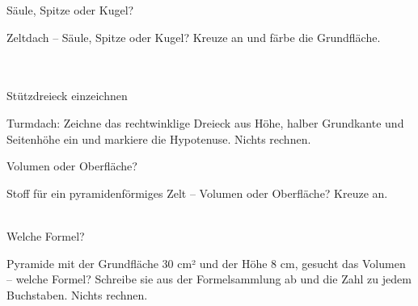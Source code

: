 \setcounter{aufgabe}{11}

\begin{aufgabe}{Säule, Spitze oder Kugel?}
\begin{teile}
\teil Zeltdach – Säule, Spitze oder Kugel? Kreuze an und färbe die Grundfläche.\\ \\ \\ 

\end{teile}
\end{aufgabe}

\begin{aufgabe}{Stützdreieck einzeichnen}
\begin{teile}
\teil Turmdach: Zeichne das rechtwinklige Dreieck aus Höhe, halber Grundkante und Seitenhöhe ein und markiere die Hypotenuse. Nichts rechnen.

\end{teile}
\end{aufgabe}

\begin{aufgabe}{Volumen oder Oberfläche?}
\begin{teile}
\teil Stoff für ein pyramidenförmiges Zelt – Volumen oder Oberfläche? Kreuze an.\\ \\ 
\end{teile}
\end{aufgabe}

\begin{aufgabe}{Welche Formel?}
\begin{teile}
\teil Pyramide mit der Grundfläche $30$ cm² und der Höhe $8$ cm, gesucht das Volumen – welche Formel? Schreibe sie aus der Formelsammlung ab und die Zahl zu jedem Buchstaben. Nichts rechnen.
\end{teile}
\end{aufgabe}

